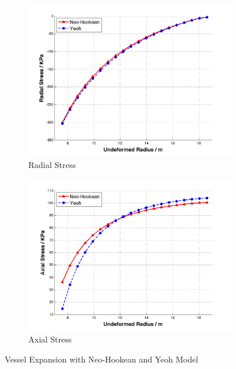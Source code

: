 \begin{figure}[t!p]
	\begin{subfigure}[b]{0.5\textwidth}
		\centering
		\includegraphics[width=\textwidth]{./figures/radial_nh_yeoh.png}
		\caption{Radial Stress}
		\label{radial_nh_yeoh}
	\end{subfigure}
	\begin{subfigure}[b]{0.5\textwidth}
		\centering
		\includegraphics[width=\textwidth]{./figures/axial_nh_yeoh.png}
		\caption{Axial Stress}
		\label{axial_nh_yeoh}
	\end{subfigure}
	\caption{Vessel Expansion with Neo-Hookean and Yeoh Model}
	\label{fig:nh_yeoh}
\end{figure}

